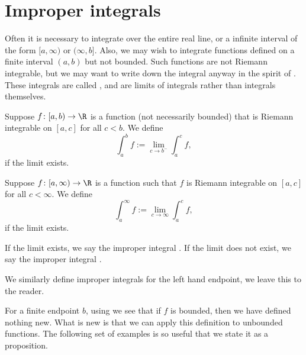 \documentclass[12pt]{book}
\begin{document}

\sectionnewpage
\section{Improper integrals}
\label{sec:impropriemann}


Often it is necessary to integrate over the
entire real line, or a infinite interval of the form $[a,\infty)$ or
$(\infty,b]$.
Also, we may wish to integrate functions defined on a finite
interval $(a,b)$ but not bounded.
Such functions are not Riemann integrable, but we may want to write down
the integral anyway in the spirit of .
These integrals are called \emph{},
and are limits
of integrals rather than integrals themselves.

\begin{defn}
Suppose $f \colon [a,b) \to \R$ is a function (not necessarily bounded)
that is Riemann integrable on $[a,c]$ for all $c < b$.
We define
\begin{equation*}
\int_a^b f := \lim_{c \to b^-} \int_a^{c} f ,
\end{equation*}
if the limit exists.%

Suppose $f \colon [a,\infty) \to \R$ is a function such that
$f$ is Riemann integrable on $[a,c]$ for all $c < \infty$.  
We define
\begin{equation*}
\int_a^\infty f := \lim_{c \to \infty} \int_a^c f ,
\end{equation*}
if the limit exists.

If the limit exists, we say the improper integral
\emph{}.
If the limit does not exist, we say the improper integral
\emph{}.

We similarly define improper integrals for the left hand endpoint, we leave
this to the reader.
\end{defn}

For a finite endpoint $b$,
using  we see that if
$f$ is bounded, then we have defined nothing new.
What is new is that
we can apply this definition to unbounded functions.
The following set of examples is
so useful that we state it as a proposition.
\end{document}
